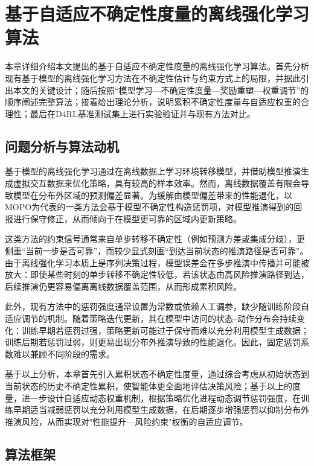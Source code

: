 \chapter{基于自适应不确定性度量的离线强化学习算法}\label{Chap:chap3}

本章详细介绍本文提出的基于自适应不确定性度量的离线强化学习算法。首先分析现有基于模型的离线强化学习方法在不确定性估计与约束方式上的局限，并据此引出本文的关键设计；随后按照“模型学习—不确定性度量—奖励重塑—权重调节”的顺序阐述完整算法；接着给出理论分析，说明累积不确定性度量与自适应权重的合理性；最后在D4RL基准测试集上进行实验验证并与现有方法对比。


\section{问题分析与算法动机}\label{Sec3.1}

基于模型的离线强化学习通过在离线数据上学习环境转移模型，并借助模型推演生成虚拟交互数据来优化策略，具有较高的样本效率。然而，离线数据覆盖有限会导致模型在分布外区域的预测偏差显著。为缓解由模型偏差带来的性能退化，以MOPO\cite{Yu2020MOPO}为代表的一类方法会基于模型不确定性构造惩罚项，对模型推演得到的回报进行保守修正，从而倾向于在模型更可靠的区域内更新策略。

这类方法的约束信号通常来自单步转移不确定性（例如预测方差或集成分歧），更侧重“当前一步是否可靠”，而较少显式刻画“到达当前状态的推演路径是否可靠”。由于离线强化学习本质上是序列决策过程，模型误差会在多步推演中传播并可能被放大：即使某些时刻的单步转移不确定性较低，若该状态由高风险推演路径到达，后续推演仍更容易偏离离线数据覆盖范围，从而形成累积风险。

此外，现有方法中的惩罚强度通常设置为常数或依赖人工调参，缺少随训练阶段自适应调节的机制。随着策略迭代更新，其在模型中访问的状态--动作分布会持续变化：训练早期若惩罚过强，策略更新可能过于保守而难以充分利用模型生成数据；训练后期若惩罚过弱，则更易出现分布外推演导致的性能退化。因此，固定惩罚系数难以兼顾不同阶段的需求。

基于以上分析，本章首先引入累积状态不确定性度量，通过综合考虑从初始状态到当前状态的历史不确定性累积，使智能体更全面地评估决策风险；基于以上的度量，进一步设计自适应动态权重机制，根据策略优化进程动态调节惩罚强度，在训练早期适当减弱惩罚以充分利用模型生成数据，在后期逐步增强惩罚以抑制分布外推演风险，从而实现对"性能提升—风险约束"权衡的自适应调节。


\section{算法框架}\label{Sec3.2}

